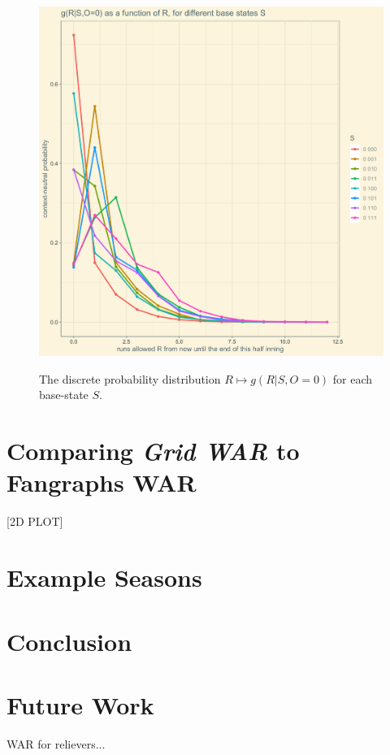 \documentclass[12pt]{article}
\begin{document}
\begin{figure}[t!]
\centering
\caption{The discrete probability distribution $R \mapsto g(R|S,O=0)$ for each base-state $S$.} 
\includegraphics[width=15cm]{../writeup_plots/plot_gRSO_R0.png}
\label{fig:g0}
\end{figure}


\section{Comparing \textit{Grid WAR} to Fangraphs WAR}

[2D PLOT]



\section{Example Seasons}



\section{Conclusion}



\section{Future Work}
WAR for relievers...


 \clearpage
 
 
\end{document}
